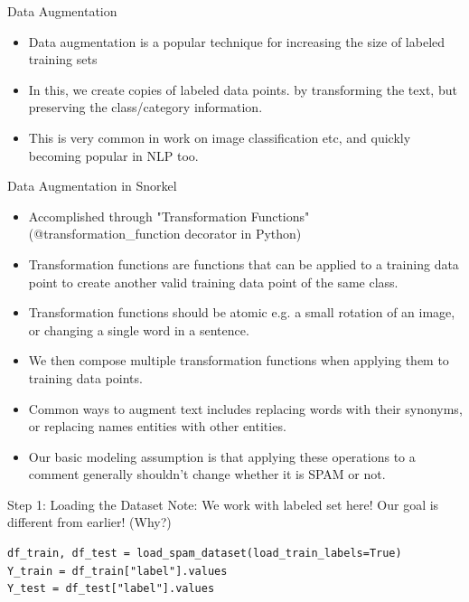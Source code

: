 \documentclass{beamer}
\begin{document}
\begin{frame}{Data Augmentation}
    \begin{itemize}
        \item Data augmentation is a popular technique for increasing the size of labeled training sets
        \item In this, we create copies of labeled data points. by transforming the text, but preserving the class/category information.
        \item This is very common in work on image classification etc, and quickly becoming popular in NLP too.
    \end{itemize}
\end{frame} %

\begin{frame}{Data Augmentation in Snorkel}
    \begin{itemize}
        \item Accomplished through "Transformation Functions" (@transformation\_function decorator in Python)
        \item Transformation functions are functions that can be applied to a training data point to create another valid training data point of the same class. 
        \item Transformation functions should be atomic e.g. a small rotation of an image, or changing a single word in a sentence. 
        \item We then compose multiple transformation functions when applying them to training data points.
        \item Common ways to augment text includes replacing words with their synonyms, or replacing names entities with other entities. 
        \item Our basic modeling assumption is that applying these operations to a comment generally shouldn't change whether it is SPAM or not.
    \end{itemize}
\end{frame}

\begin{frame}[fragile]{Step 1: Loading the Dataset}
Note: We work with labeled set here! Our goal is different from earlier! (Why?)
\small\begin{verbatim}
df_train, df_test = load_spam_dataset(load_train_labels=True)
Y_train = df_train["label"].values
Y_test = df_test["label"].values
\end{verbatim}
\end{frame}
\end{document}
